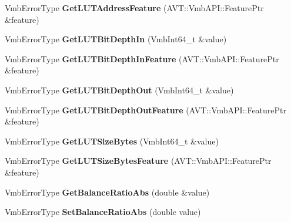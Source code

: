 \begin{DoxyCompactItemize}
\item 
\hypertarget{classMakoCamera_aab95751c80098e235a6a1955c78116b2}{Vmb\-Error\-Type {\bfseries Get\-L\-U\-T\-Address\-Feature} (A\-V\-T\-::\-Vmb\-A\-P\-I\-::\-Feature\-Ptr \&feature)}\label{classMakoCamera_aab95751c80098e235a6a1955c78116b2}

\item 
\hypertarget{classMakoCamera_ae9b8a1cd7582db0ffc5c3bfedcd8fd9c}{Vmb\-Error\-Type {\bfseries Get\-L\-U\-T\-Bit\-Depth\-In} (Vmb\-Int64\-\_\-t \&value)}\label{classMakoCamera_ae9b8a1cd7582db0ffc5c3bfedcd8fd9c}

\item 
\hypertarget{classMakoCamera_a5633f64561f35c2192bd6b0064b20499}{Vmb\-Error\-Type {\bfseries Get\-L\-U\-T\-Bit\-Depth\-In\-Feature} (A\-V\-T\-::\-Vmb\-A\-P\-I\-::\-Feature\-Ptr \&feature)}\label{classMakoCamera_a5633f64561f35c2192bd6b0064b20499}

\item 
\hypertarget{classMakoCamera_abf0f072dd95848fa590f8add4b552251}{Vmb\-Error\-Type {\bfseries Get\-L\-U\-T\-Bit\-Depth\-Out} (Vmb\-Int64\-\_\-t \&value)}\label{classMakoCamera_abf0f072dd95848fa590f8add4b552251}

\item 
\hypertarget{classMakoCamera_a1fbcd446d3ce9a67a4eb3c19431ef132}{Vmb\-Error\-Type {\bfseries Get\-L\-U\-T\-Bit\-Depth\-Out\-Feature} (A\-V\-T\-::\-Vmb\-A\-P\-I\-::\-Feature\-Ptr \&feature)}\label{classMakoCamera_a1fbcd446d3ce9a67a4eb3c19431ef132}

\item 
\hypertarget{classMakoCamera_a8eaf455b414718d68ead9f666cf6ef40}{Vmb\-Error\-Type {\bfseries Get\-L\-U\-T\-Size\-Bytes} (Vmb\-Int64\-\_\-t \&value)}\label{classMakoCamera_a8eaf455b414718d68ead9f666cf6ef40}

\item 
\hypertarget{classMakoCamera_af386f677389120e7be5c98100ff98e96}{Vmb\-Error\-Type {\bfseries Get\-L\-U\-T\-Size\-Bytes\-Feature} (A\-V\-T\-::\-Vmb\-A\-P\-I\-::\-Feature\-Ptr \&feature)}\label{classMakoCamera_af386f677389120e7be5c98100ff98e96}

\item 
\hypertarget{classMakoCamera_ae70eed18ae8e9082f74ff52b7ff20424}{Vmb\-Error\-Type {\bfseries Get\-Balance\-Ratio\-Abs} (double \&value)}\label{classMakoCamera_ae70eed18ae8e9082f74ff52b7ff20424}

\item 
\hypertarget{classMakoCamera_acace669406bccb4dae1d3347445b13af}{Vmb\-Error\-Type {\bfseries Set\-Balance\-Ratio\-Abs} (double value)}\label{classMakoCamera_acace669406bccb4dae1d3347445b13af}


\end{DoxyCompactItemize}
